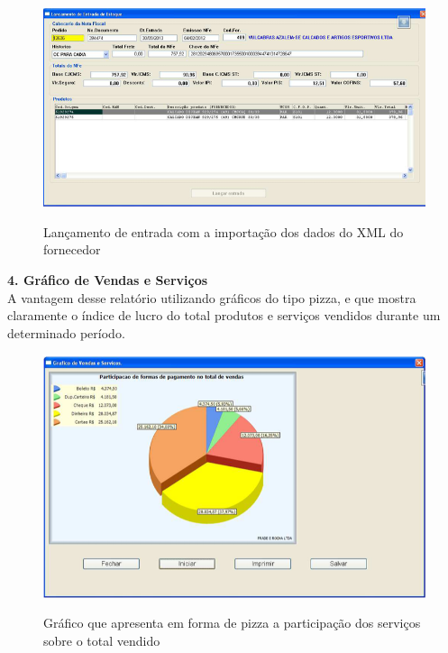 \documentclass[12pt,openright,twoside,a4paper,english,french,spanish,brazil]{abntex2}
\begin{document}
\begin{figure}[htb!]
\includegraphics[scale=0.7]{nota_fiscal} 
\centering
\caption{Lançamento de entrada com a importação dos dados do XML do fornecedor} 
\cite{NetServiceConsultoriaemSistemas2013}
\label{img_nota_fiscal}
\end{figure}

\newpage
\textbf{4.	{Gráfico de Vendas e Serviços}}\\
A vantagem desse relatório utilizando gráficos do tipo pizza, e que mostra claramente o índice de lucro do total produtos e serviços vendidos durante um determinado período.

\begin{figure}[htb!]
\includegraphics[scale=0.7]{grafico_vendas_servico} 
\centering
\caption{Gráfico que apresenta em forma de pizza a participação dos serviços sobre o total vendido}
\cite{NetServiceConsultoriaemSistemas2013}
\label{img_grafico_vendas_servico}
\end{figure}

\newpage
\end{document}
